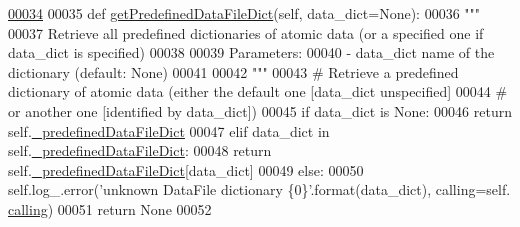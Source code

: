 \begin{DoxyCode}
\hypertarget{classpyneb_1_1utils_1_1manage__atomic__data_1_1___manage_atomic_data_l00034}{}\hyperlink{classpyneb_1_1utils_1_1manage__atomic__data_1_1___manage_atomic_data_a95c5df20a27033c4c32831d85a1c2876}{00034} 
00035     \textcolor{keyword}{def }\hyperlink{classpyneb_1_1utils_1_1manage__atomic__data_1_1___manage_atomic_data_a95c5df20a27033c4c32831d85a1c2876}{getPredefinedDataFileDict}(self, data\_dict=None):
00036         \textcolor{stringliteral}{"""}
00037 \textcolor{stringliteral}{        Retrieve all predefined dictionaries of atomic data (or a specified one if data\_dict is specified)}
00038 \textcolor{stringliteral}{        }
00039 \textcolor{stringliteral}{        Parameters:}
00040 \textcolor{stringliteral}{           - data\_dict    name of the dictionary (default: None)}
00041 \textcolor{stringliteral}{}
00042 \textcolor{stringliteral}{        """}
00043 \textcolor{comment}{#        Retrieve a predefined dictionary of atomic data (either the default one [data\_dict unspecified]}
00044 \textcolor{comment}{#        or another one [identified by data\_dict])}
00045         \textcolor{keywordflow}{if} data\_dict \textcolor{keywordflow}{is} \textcolor{keywordtype}{None}:
00046             \textcolor{keywordflow}{return} self.\hyperlink{classpyneb_1_1utils_1_1manage__atomic__data_1_1___manage_atomic_data_ad9b54bc077170e477f23059e2256b30f}{\_predefinedDataFileDict}
00047         \textcolor{keywordflow}{elif} data\_dict \textcolor{keywordflow}{in} self.\hyperlink{classpyneb_1_1utils_1_1manage__atomic__data_1_1___manage_atomic_data_ad9b54bc077170e477f23059e2256b30f}{\_predefinedDataFileDict}:
00048             \textcolor{keywordflow}{return} self.\hyperlink{classpyneb_1_1utils_1_1manage__atomic__data_1_1___manage_atomic_data_ad9b54bc077170e477f23059e2256b30f}{\_predefinedDataFileDict}[data\_dict]
00049         \textcolor{keywordflow}{else}:
00050             self.log\_.error(\textcolor{stringliteral}{'unknown DataFile dictionary \{0\}'}.format(data\_dict), calling=self.
      \hyperlink{classpyneb_1_1utils_1_1manage__atomic__data_1_1___manage_atomic_data_ab10b91ca784741ce7af163d010802434}{calling})
00051             \textcolor{keywordflow}{return} \textcolor{keywordtype}{None}
00052 

\end{DoxyCode}
